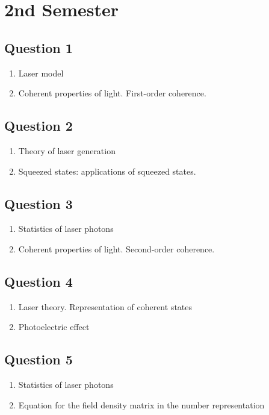 \documentclass[12pt,a4paper]{article}
\begin{document}
\section*{2nd Semester}


\subsection*{Question 1} 
\begin{enumerate}
\item Laser model
\item Coherent properties of light.
First-order coherence.
\end{enumerate}

\subsection*{Question 2} 
\begin{enumerate}
\item Theory of laser generation
\item Squeezed states: applications of squeezed states.
\end{enumerate}

\subsection*{Question 3} 
\begin{enumerate}
\item Statistics of laser photons
\item Coherent properties of light.
Second-order coherence.
\end{enumerate}

\subsection*{Question 4} 
\begin{enumerate}
\item Laser theory. Representation of coherent states
\item Photoelectric effect
\end{enumerate}

\subsection*{Question 5} 
\begin{enumerate}
\item Statistics of laser photons
\item Equation for the field density matrix in the number representation
\end{enumerate}
\end{document}

